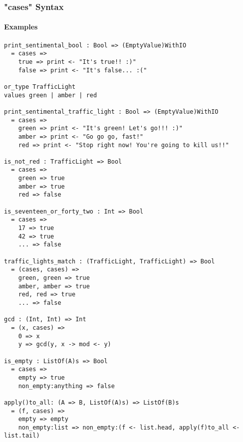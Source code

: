 \documentclass{article}
\begin{document}
\subsubsection{"cases" Syntax}

\paragraph{Examples}

\begin{verbatim}
print_sentimental_bool : Bool => (EmptyValue)WithIO
  = cases =>
    true => print <- "It's true!! :)"
    false => print <- "It's false... :("

or_type TrafficLight
values green | amber | red

print_sentimental_traffic_light : Bool => (EmptyValue)WithIO
  = cases =>
    green => print <- "It's green! Let's go!!! :)"
    amber => print <- "Go go go, fast!"
    red => print <- "Stop right now! You're going to kill us!!"

is_not_red : TrafficLight => Bool
  = cases =>
    green => true
    amber => true
    red => false

is_seventeen_or_forty_two : Int => Bool
  = cases => 
    17 => true
    42 => true
    ... => false
 
traffic_lights_match : (TrafficLight, TrafficLight) => Bool
  = (cases, cases) =>
    green, green => true
    amber, amber => true
    red, red => true
    ... => false

gcd : (Int, Int) => Int
  = (x, cases) =>
    0 => x
    y => gcd(y, x -> mod <- y) 

is_empty : ListOf(A)s => Bool
  = cases => 
    empty => true
    non_empty:anything => false

apply()to_all: (A => B, ListOf(A)s) => ListOf(B)s
  = (f, cases) =>
    empty => empty
    non_empty:list => non_empty:(f <- list.head, apply(f)to_all <- list.tail)

\end{verbatim}
\end{document}
